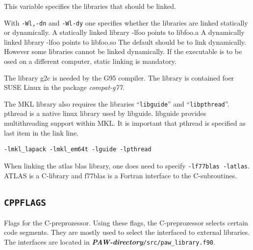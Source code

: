 \documentclass[a4paper,10pt]{report}
\newcommand{\myspec}[1]{\textbf{\textit{#1}}}
\newcommand{\mytt}[1]{{\tt #1}}
\begin{document}
This variable specifies the libraries that should be linked.

With \mytt{-Wl,-dn} and \mytt{-Wl-dy} one specifies whether the
libraries are linked statically or dynamically.  A statically linked
library -lfoo points to libfoo.a A dynamically linked library -lfoo
points to libfoo.so The default should be to link dynamically. However
some libraries cannot be linked dynamically. If the executable is to
be osed on a different computer, static linking is mandatory.

The library g2c is needed by the G95 compiler. The library is
contained foer SUSE Linux in the package \textit{compat-g77}.

The MKL library also requires the libraries ``\mytt{libguide}'' and
``\mytt{libpthread}''. pthread is a native linux library used by
libguide. libguide provides multithreading support within MKL. It is
important that pthread is specified as last item in the link line.
\begin{verbatim}
-lmkl_lapack -lmkl_em64t -lguide -lpthread
\end{verbatim}

When linking the atlas blas library, one does need to specify
\mytt{-lf77blas -latlas}. ATLAS is a C-library and f77blas is a
Fortran interface to the C-subroutines. 


\subsection{\mytt{CPPFLAGS}}

Flags for the C-preprozessor. Using these flags, the C-preprozessor
selects certain code segments. They are mostly used to select the
interfaced to external libraries.  The interfaces are located in
\myspec{PAW-directory}\mytt{/src/paw\_library.f90}.
\end{document}
